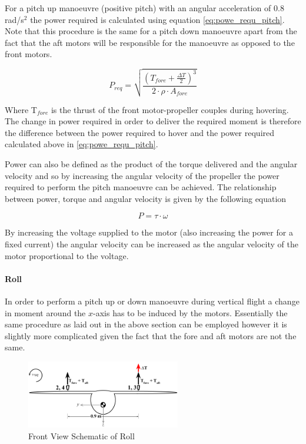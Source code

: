 For a pitch up manoeuvre (positive pitch) with an angular acceleration of 0.8 rad/s$^2$ the power required is calculated using equation \autoref{eq:powe_requ_pitch}. Note that this procedure is the same for a pitch down manoeuvre apart from the fact that the aft motors will be responsible for the manoeuvre as opposed to the front motors.

\begin{equation}
\label{eq:powe_requ_pitch}
P_{req} = \sqrt{\frac{(T_{fore}+\frac{\Delta T}{2})^{3}}{2 \cdot \rho \cdot A_{fore}}}
\end{equation}

Where T$_{fore}$ is the thrust of the front motor-propeller couples during hovering. The change in power required in order to deliver the required moment is therefore the difference between the power required to hover and the power required calculated above in \autoref{eq:powe_requ_pitch}.

Power can also be defined as the product of the torque delivered and the angular velocity and so by increasing the angular velocity of the propeller the power required to perform the pitch manoeuvre can be achieved. The relationship between power, torque and angular velocity is given by the following equation

\begin{equation}
\label{eq:powe_torq_angu_velo}
P = \tau \cdot \omega
\end{equation}

By increasing the voltage supplied to the motor (also increasing the power for a fixed current) the angular velocity can be increased as the angular velocity of the motor proportional to the voltage.

\paragraph{Roll}
In order to perform a pitch up or down manoeuvre during vertical flight a change in moment around the $x$-axis has to be induced by the motors. Essentially the same procedure as laid out in the above section can be employed however it is slightly more complicated given the fact that the fore and aft motors are not the same. 

\begin{figure}[H]
    \centering
    \includegraphics[width=0.6\textwidth]{StabilityandControl/Figures/Front_view_control.png}
    \caption{Front View Schematic of Roll}
    \label{fig:schematic_front}
\end{figure}

